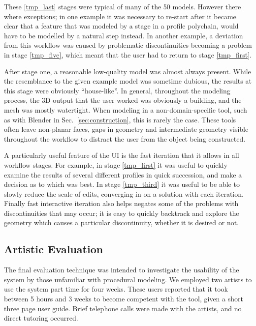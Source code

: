 These \ref{tmp_last} stages were typical of many of the 50 models. However there where exceptions; in one example it was necessary to re-start after it became clear that a feature that was modeled by a stage in a profile polychain, would have to be modelled by a natural step instead. In another example, a deviation from this workflow was caused by problematic discontinuities becoming a problem in stage \ref{tmp_five}, which meant that the user had to return to stage \ref{tmp_first}.

After stage one, a reasonable low-quality model was almost always present. While the resemblance to the given example model was sometime dubious, the results at this stage were obviously ``house-like''. In general, throughout the modeling process, the 3D output that the user worked was obviously a building, and the mesh was mostly watertight. When modeling in a non-domain-specific tool, such as with Blender in Sec.~\ref{sec:construction}, this is rarely the case. These tools often leave non-planar faces, gaps in geometry and intermediate geometry visible throughout the workflow to distract the user from the object being constructed.

A particularly useful feature of the UI is the fast iteration that it allows in all workflow stages. For example, in stage \ref{tmp_first} it was useful to quickly examine the results of several different profiles in quick succession, and make a decision as to which was best. In stage \ref{tmp_third} it was useful to be able to slowly reduce the scale of edits, converging in on a solution with each iteration. Finally fast interactive iteration also helps negates some of the problems with discontinuities that may occur; it is easy to quickly backtrack and explore the geometry which causes a particular discontinuity, whether it is desired or not.




\FloatBarrier
\subsection{Artistic Evaluation}
\label{Sec:Art_Eval}

The final evaluation technique was intended to investigate the usability of the system by those unfamiliar with procedural modeling. We employed two artists to use the system part time for four weeks. These users reported that it took between 5 hours and 3 weeks to become competent with the tool, given a short three page user guide. Brief telephone calls were made with the artists, and no direct tutoring occurred. 

